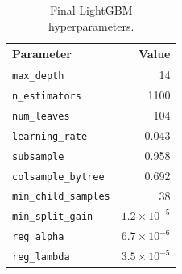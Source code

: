 \begin{table}[htbp]
    \centering
    \caption{Final LightGBM hyperparameters.}
    \label{tab:final_lgbm}
    \begin{tabular}{lr}
        \toprule
        \textbf{Parameter} & \textbf{Value} \\
        \midrule
        \texttt{max\_depth} & 14 \\
        \texttt{n\_estimators} & 1100 \\
        \texttt{num\_leaves} & 104 \\
        \texttt{learning\_rate} & 0.043 \\
        \texttt{subsample} & 0.958 \\
        \texttt{colsample\_bytree} & 0.692 \\
        \texttt{min\_child\_samples} & 38 \\
        \texttt{min\_split\_gain} & $1.2 \times 10^{-5}$ \\
        \texttt{reg\_alpha} & $6.7 \times 10^{-6}$ \\
        \texttt{reg\_lambda} & $3.5 \times 10^{-5}$ \\
        \bottomrule
    \end{tabular}
\end{table}
